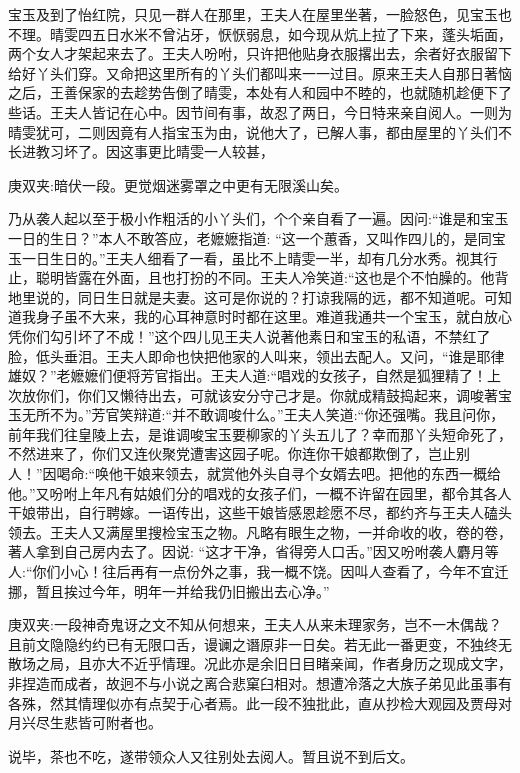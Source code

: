 \begin{parag}
    宝玉及到了怡红院，只见一群人在那里，王夫人在屋里坐著，一脸怒色，见宝玉也不理。晴雯四五日水米不曾沾牙，恹恹弱息，如今现从炕上拉了下来，蓬头垢面，两个女人才架起来去了。王夫人吩咐，只许把他贴身衣服撂出去，余者好衣服留下给好丫头们穿。又命把这里所有的丫头们都叫来一一过目。原来王夫人自那日著恼之后，王善保家的去趁势告倒了晴雯，本处有人和园中不睦的，也就随机趁便下了些话。王夫人皆记在心中。因节间有事，故忍了两日，今日特来亲自阅人。一则为晴雯犹可，二则因竟有人指宝玉为由，说他大了，已解人事，都由屋里的丫头们不长进教习坏了。因这事更比晴雯一人较甚，\begin{note}庚双夹:暗伏一段。更觉烟迷雾罩之中更有无限溪山矣。\end{note}乃从袭人起以至于极小作粗活的小丫头们，个个亲自看了一遍。因问:“谁是和宝玉一日的生日？”本人不敢答应，老嬷嬷指道: “这一个蕙香，又叫作四儿的，是同宝玉一日生日的。”王夫人细看了一看，虽比不上晴雯一半，却有几分水秀。视其行止，聪明皆露在外面，且也打扮的不同。王夫人冷笑道:“这也是个不怕臊的。他背地里说的，同日生日就是夫妻。这可是你说的？打谅我隔的远，都不知道呢。可知道我身子虽不大来，我的心耳神意时时都在这里。难道我通共一个宝玉，就白放心凭你们勾引坏了不成！”这个四儿见王夫人说著他素日和宝玉的私语，不禁红了脸，低头垂泪。王夫人即命也快把他家的人叫来，领出去配人。又问，“谁是耶律雄奴？”老嬷嬷们便将芳官指出。王夫人道:“唱戏的女孩子，自然是狐狸精了！上次放你们，你们又懒待出去，可就该安分守己才是。你就成精鼓捣起来，调唆著宝玉无所不为。”芳官笑辩道:“并不敢调唆什么。”王夫人笑道:“你还强嘴。我且问你，前年我们往皇陵上去，是谁调唆宝玉要柳家的丫头五儿了？幸而那丫头短命死了，不然进来了，你们又连伙聚党遭害这园子呢。你连你干娘都欺倒了，岂止别人！”因喝命:“唤他干娘来领去，就赏他外头自寻个女婿去吧。把他的东西一概给他。”又吩咐上年凡有姑娘们分的唱戏的女孩子们，一概不许留在园里，都令其各人干娘带出，自行聘嫁。一语传出，这些干娘皆感恩趁愿不尽，都约齐与王夫人磕头领去。王夫人又满屋里搜检宝玉之物。凡略有眼生之物，一并命收的收，卷的卷，著人拿到自己房内去了。因说: “这才干净，省得旁人口舌。”因又吩咐袭人麝月等人:“你们小心！往后再有一点份外之事，我一概不饶。因叫人查看了，今年不宜迁挪，暂且挨过今年，明年一并给我仍旧搬出去心净。”\begin{note}庚双夹:一段神奇鬼讶之文不知从何想来，王夫人从来未理家务，岂不一木偶哉？且前文隐隐约约已有无限口舌，谩谰之谮原非一日矣。若无此一番更变，不独终无散场之局，且亦大不近乎情理。况此亦是余旧日目睹亲闻，作者身历之现成文字，非捏造而成者，故迥不与小说之离合悲窠臼相对。想遭冷落之大族子弟见此虽事有各殊，然其情理似亦有点契于心者焉。此一段不独批此，直从抄检大观园及贾母对月兴尽生悲皆可附者也。\end{note}说毕，茶也不吃，遂带领众人又往别处去阅人。暂且说不到后文。
\end{parag}


